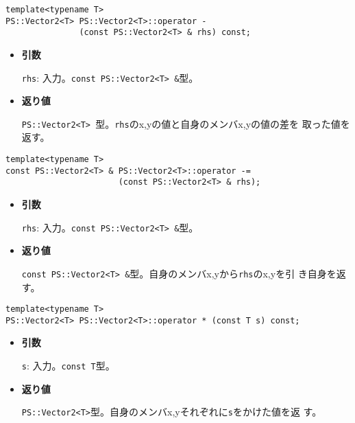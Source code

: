 \begin{screen}
\begin{verbatim}
template<typename T>
PS::Vector2<T> PS::Vector2<T>::operator - 
               (const PS::Vector2<T> & rhs) const;
\end{verbatim}
\end{screen}

\begin{itemize}

\item{{\bf 引数}}

{\tt rhs}: 入力。{\tt const PS::Vector2<T> \&}型。

\item{{\bf 返り値}}

{\tt PS::Vector2<T> }型。{\tt rhs}のx,yの値と自身のメンバx,yの値の差を
取った値を返す。

\end{itemize}

\begin{screen}
\begin{verbatim}
template<typename T>
const PS::Vector2<T> & PS::Vector2<T>::operator -= 
                       (const PS::Vector2<T> & rhs);
\end{verbatim}
\end{screen}

\begin{itemize}

\item{{\bf 引数}}

{\tt rhs}: 入力。{\tt const PS::Vector2<T> \&}型。

\item{{\bf 返り値}}

{\tt const PS::Vector2<T> \&}型。自身のメンバx,yから{\tt rhs}のx,yを引
き自身を返す。

\end{itemize}


\begin{screen}
\begin{verbatim}
template<typename T>
PS::Vector2<T> PS::Vector2<T>::operator * (const T s) const;
\end{verbatim}
\end{screen}

\begin{itemize}

\item{{\bf 引数}}

{\tt s}: 入力。{\tt const T}型。

\item{{\bf 返り値}}

{\tt PS::Vector2<T>}型。自身のメンバx,yそれぞれに{\tt s}をかけた値を返
す。

\end{itemize}

